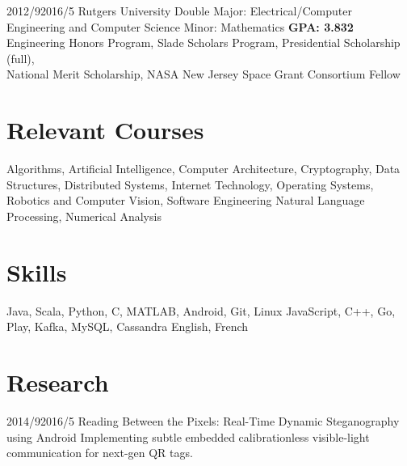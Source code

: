 \documentclass[11pt,letterpaper]{moderncv}
\begin{document}
\tlcventry
    {2012/9}{2016/5}
    {Rutgers University}
    {Double Major: Electrical/Computer Engineering and Computer Science}
    {Minor: Mathematics}
    {\textbf{GPA: 3.832}}
    {Engineering Honors Program, Slade Scholars Program, Presidential Scholarship (full),\\National Merit Scholarship, NASA New Jersey Space Grant Consortium Fellow}


\section{Relevant Courses}
       {Algorithms, Artificial Intelligence, Computer Architecture, Cryptography, Data Structures, Distributed Systems, Internet Technology, Operating Systems, Robotics and Computer Vision, Software Engineering}
       {Natural Language Processing, Numerical Analysis}

\section{Skills}
       {Java, Scala, Python, C, MATLAB, Android, Git, Linux}
       {JavaScript, C++, Go, Play, Kafka, MySQL, Cassandra}
       {English, French}

\section{Research}
    \tlcventry
        {2014/9}{2016/5}
		{Reading Between the Pixels: Real-Time Dynamic Steganography using Android}
        {}
        {}
        {}
        {Implementing subtle embedded calibrationless visible-light communication for next-gen QR tags.}

%
\end{document}
